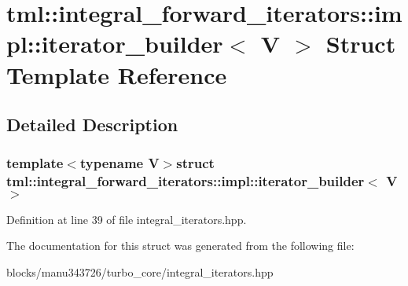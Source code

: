 \hypertarget{structtml_1_1integral__forward__iterators_1_1impl_1_1iterator__builder}{\section{tml\+:\+:integral\+\_\+forward\+\_\+iterators\+:\+:impl\+:\+:iterator\+\_\+builder$<$ V $>$ Struct Template Reference}
\label{structtml_1_1integral__forward__iterators_1_1impl_1_1iterator__builder}
}


\subsection{Detailed Description}
\subsubsection*{template$<$typename V$>$struct tml\+::integral\+\_\+forward\+\_\+iterators\+::impl\+::iterator\+\_\+builder$<$ V $>$}



Definition at line 39 of file integral\+\_\+iterators.\+hpp.



The documentation for this struct was generated from the following file\+:\begin{DoxyCompactItemize}
\item 
blocks/manu343726/turbo\+\_\+core/integral\+\_\+iterators.\+hpp\end{DoxyCompactItemize}
